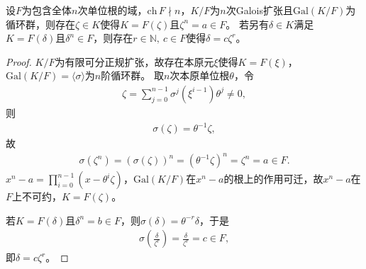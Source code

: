\documentclass[../../main.tex]{subfiles}%
\begin{document}
\begin{theorem}
设$F$为包含全体$n$次单位根的域，$\mathrm{ch}\,F\nmid n$，$K/F$为$n$次Galois扩张且$\mathrm{Gal}(K/F)$为循环群，则存在$\zeta\in K$使得$K=F(\zeta)$且$\zeta^n=a\in F$。
若另有$\delta\in K$满足$K=F(\delta)$且$\delta^n\in F$，则存在$r\in\mathbb{N},\ c\in F$使得$\delta=c\zeta^r$。
\end{theorem}
\begin{proof}

$K/F$为有限可分正规扩张，故存在本原元$\xi$使得$K=F(\xi)$，$\mathrm{Gal}(K/F)=\langle\sigma\rangle$为$n$阶循环群。
取$n$次本原单位根$\theta$，令
\begin{align*}
\zeta=\sum\limits_{j=0}^{n-1}\sigma^j(\xi^{i-1})\theta^j\neq0,
\end{align*}
则
\begin{align*}
\sigma(\zeta)=\theta^{-1}\zeta,
\end{align*}
故
\begin{align*}
\sigma(\zeta^n)=(\sigma(\zeta))^n=(\theta^{-1}\zeta)^n=\zeta^n=a\in F.
\end{align*}
$x^n-a=\prod\limits_{i=0}^{n-1}(x-\theta^i\zeta)$，$\mathrm{Gal}(K/F)$在$x^n-a$的根上的作用可迁，故$x^n-a$在$F$上不可约，$K=F(\zeta)$。

若$K=F(\delta)$且$\delta^n=b\in F$，则$\sigma(\delta)=\theta^{-r}\delta$，于是
\begin{align*}
\sigma\left(\frac{\delta}{\zeta^r}\right)=\frac{\delta}{\zeta^r}=c\in F,
\end{align*}
即$\delta=c\zeta^r$。

\end{proof}
\end{document}
